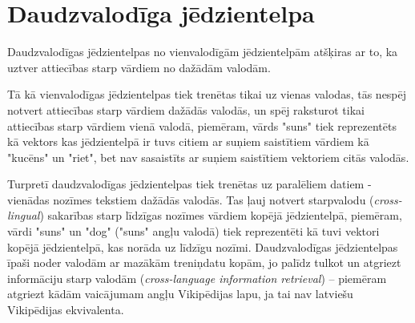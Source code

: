 

\section{Daudzvalodīga jēdzientelpa}

Daudzvalodīgas jēdzientelpas no vienvalodīgām jēdzientelpām atšķiras ar to, ka uztver attiecības starp vārdiem no dažādām valodām.

Tā kā vienvalodīgas jēdzientelpas tiek trenētas tikai uz vienas valodas, tās nespēj notvert attiecības starp vārdiem dažādās valodās, un spēj raksturot tikai attiecības starp vārdiem vienā valodā, piemēram, vārds "suns" tiek reprezentēts kā vektors kas jēdzientelpā ir tuvs citiem ar suņiem saistītiem vārdiem kā "kucēns" un "riet", bet nav sasaistīts ar suņiem saistītiem vektoriem citās valodās.

Turpretī daudzvalodīgas jēdzientelpas tiek trenētas uz paralēliem datiem - vienādas nozīmes tekstiem dažādās valodās. Tas ļauj notvert starpvalodu (\textit{cross-lingual}) sakarības starp līdzīgas nozīmes vārdiem kopējā jēdzientelpā, piemēram, vārdi "suns" un "dog" ("suns" angļu valodā) tiek reprezentēti kā tuvi vektori kopējā jēdzientelpā, kas norāda uz līdzīgu nozīmi. Daudzvalodīgas jēdzientelpas īpaši noder valodām ar mazākām treniņdatu kopām, jo palīdz tulkot un atgriezt informāciju starp valodām (\textit{cross-language information retrieval}) -- piemēram atgriezt kādām vaicājumam angļu Vikipēdijas lapu, ja tai nav latviešu Vikipēdijas ekvivalenta.
